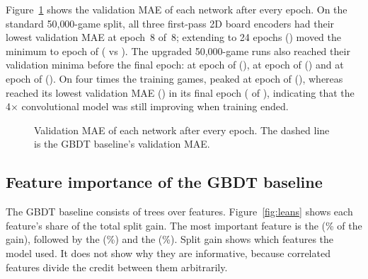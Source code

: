 \documentclass[11pt]{article}
\begin{document}
Figure~\ref{fig:curves} shows the validation MAE of each network after every
epoch. On the standard 50{,}000-game split, all three first-pass 2D board
encoders had their lowest validation MAE at epoch~8 of~8; extending
 to 24 epochs () moved the minimum to
epoch  of 
( vs ). The
upgraded 50{,}000-game runs also reached their validation minima before the
final epoch:  at epoch  of
 (),
 at epoch  of
 () and
 at epoch
 of
(). On four times the training
games,  peaked at epoch
 of
(), whereas  reached its
lowest validation MAE () in its final epoch
( of ), indicating that the 4$\times$
convolutional model was still improving when training ended.

\begin{figure}[htbp]\centering
{}
\caption{Validation MAE of each network after every epoch. The dashed line
is the GBDT baseline's validation MAE.}
\label{fig:curves}
\end{figure}

\subsection{Feature importance of the GBDT baseline}
\label{sec:importance}

The GBDT baseline consists of  trees over
 features. Figure~\ref{fig:leans} shows each feature's
share of the total split gain. The most important feature is the
 (\% of the gain),
followed by the 
(\%) and the 
(\%). Split gain shows which features the model
used. It does not show why they are informative, because correlated features
divide the credit between them arbitrarily.
\end{document}
